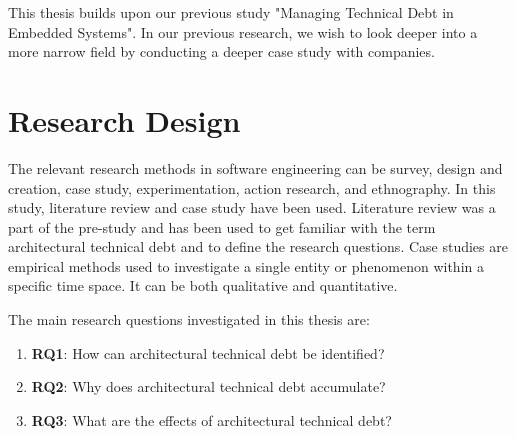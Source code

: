 This thesis builds upon our previous study "Managing Technical Debt in Embedded Systems"\cite{forprosjekt}. In our previous research, we wish to look deeper into a more narrow field by conducting a deeper case study with companies.











\section{Research Design}
The relevant research methods in software engineering can be survey, design and creation, case study, experimentation, action research, and ethnography\cite{Oates:2006:RIS:1202299}. In this study, literature review and case study have been used. Literature review was a part of the pre-study and has been used to get familiar with the term architectural technical debt and to define the research questions. Case studies are empirical methods used to investigate a single entity or phenomenon within a specific time space\cite{Wohlin:2000:ESE:330775}. It can be both qualitative and quantitative\cite{bassey2003case,Oates:2006:RIS:1202299}.

The main research questions investigated in this thesis are:

\begin{enumerate}
	\item \textbf{RQ1}: How can architectural technical debt be identified?
	\item \textbf{RQ2}: Why does architectural technical debt accumulate?
	\item \textbf{RQ3}: What are the effects of architectural technical debt?
\end{enumerate}

